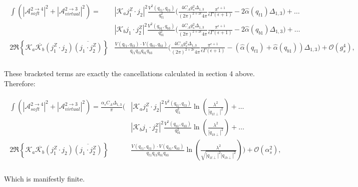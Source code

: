 		\begin{align}
		\begin{split}
		\int\left(|\mathcal{A}^{2\rightarrow4}_{soft}|^2 + |\mathcal{A}^{2\rightarrow3}_{virtual}|^2\right) = &|\mathcal{K}_aj_1^Z\cdot j_2|^2 \frac{V^2(q_{t1}, q_{t3})}{q_{t1}^2} {\Bigg(\frac{4C_Ag_s^2\Delta_{1,3}}{(2\pi)^{2+2\epsilon}4\pi}\frac{\pi^{\epsilon+1}}{\epsilon\Gamma(\epsilon+1)} - 2\hat{\alpha}(q_{t1})\Delta_{1,3}\Bigg)}+\ldots \\
		& |\mathcal{K}_bj_1\cdot j_2^Z|^2 \frac{V^2(q_{b1}, q_{b3})}{q_{b1}^2} {\Bigg(\frac{4C_Ag_s^2\Delta_{1,3}}{(2\pi)^{2+2\epsilon}4\pi}\frac{\pi^{\epsilon+1}}{\epsilon\Gamma(\epsilon+1)} - 2\hat{\alpha}(q_{b1})\Delta_{1,3}\Bigg)}+\ldots \\
		 2\Re\left\{\mathcal{K}_a\overline{\mathcal{K}_b}  (j_1^Z\cdot j_2)\overline{(j_1\cdot j_2^Z)}\right\}&\frac{V(q_{t1}, q_{t3})\cdot V(q_{b1}, q_{b3})}{q_{t1}q_{t3}q_{b1}q_{b3}}{\Bigg(\frac{4C_Ag_s^2\Delta_{1,3}}{(2\pi)^{2+2\epsilon}4\pi}\frac{\pi^{\epsilon+1}}{\epsilon\Gamma(\epsilon+1)} - (\hat{\alpha}(q_{t1}) + \hat{\alpha}(q_{b1}))\Delta_{1,3}\Bigg)} + \mathcal{O}(g_s^4),\\
		\end{split}
		\end{align}

		These bracketed terms are exactly the cancellations calculated in section 4 above.  Therefore:

		\begin{align}
		\begin{split}
		\int\left(|\mathcal{A}^{2\rightarrow4}_{soft}|^2 + |\mathcal{A}^{2\rightarrow3}_{virtual}|^2\right) = \frac{\alpha_sC_A\Delta_{1,3}}{\pi}\Bigg(&|\mathcal{K}_aj_1^Z\cdot j_2|^2 \frac{V^2(q_{t1}, q_{t3})}{q_{t1}^2}\ln\left(\frac{\lambda^2}{|q_{1t\perp}|^2}\right)+\ldots \\
		& |\mathcal{K}_bj_1\cdot j_2^Z|^2 \frac{V^2(q_{b1}, q_{b3})}{q_{b1}^2}\ln\left(\frac{\lambda^2}{|q_{1b\perp}|^2}\right)+\ldots \\
		 2\Re\left\{\mathcal{K}_a\overline{\mathcal{K}_b}  (j_1^Z\cdot j_2)\overline{(j_1\cdot j_2^Z)}\right\}&\frac{V(q_{t1}, q_{t3})\cdot V(q_{b1}, q_{b3})}{q_{t1}q_{t3}q_{b1}q_{b3}}\ln\left(\frac{\lambda^2}{\sqrt{|q_{1t\perp}|^2|q_{1b\perp}|^2}}\right)\Bigg) + \mathcal{O}(\alpha_s^2),\\
		\end{split}
		\end{align}

		Which is manifestly finite.

